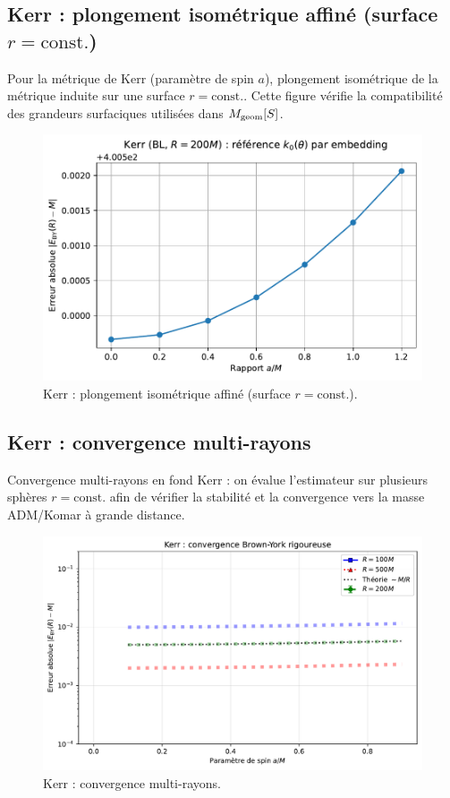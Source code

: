 \documentclass[11pt,a4paper]{article}
\begin{document}
\medskip

\subsection*{Kerr : plongement isométrique affiné (surface $r=\text{const.}$)}
Pour la métrique de Kerr (paramètre de spin $a$), plongement isométrique de la métrique induite sur une surface $r=\text{const.}$. Cette figure vérifie la compatibilité des grandeurs surfaciques utilisées dans $M_{\rm geom}[S]$.

\begin{figure}[htbp]
  \centering
  \includegraphics[width=\linewidth]{fig_kerr_embedding_refined.pdf}
  \caption{Kerr : plongement isométrique affiné (surface $r=\text{const.}$).}
  \label{fig:fig_kerr_embedding_refined}
\end{figure}

\medskip

\subsection*{Kerr : convergence multi-rayons}
Convergence multi-rayons en fond Kerr : on évalue l’estimateur sur plusieurs sphères $r=\text{const.}$ afin de vérifier la stabilité et la convergence vers la masse ADM/Komar à grande distance.

\begin{figure}[htbp]
  \centering
  \includegraphics[width=\linewidth]{fig_kerr_multiradius.pdf}
  \caption{Kerr : convergence multi-rayons.}
  \label{fig:fig_kerr_multiradius}
\end{figure}
\end{document}

